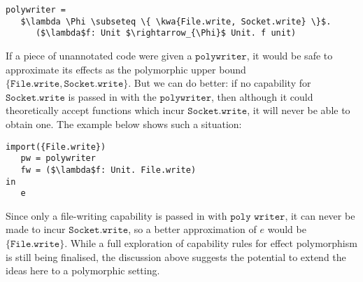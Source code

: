 \documentclass[sigplan,10pt]{acmart}\settopmatter{}
\newcommand{\kwa}[1]{\mathtt{#1}}
\begin{document}
\begin{lstlisting}
polywriter =
   $\lambda \Phi \subseteq \{ \kwa{File.write, Socket.write} \}$.
      ($\lambda$f: Unit $\rightarrow_{\Phi}$ Unit. f unit)
\end{lstlisting}

If a piece of unannotated code were given a $\kwa{polywriter}$, it would be safe to approximate its effects as the polymorphic upper bound $\{ \kwa{File.write, Socket.write} \}$. But we can do better: if no capability for $\kwa{Socket.write}$ is passed in with the $\kwa{polywriter}$, then although it could theoretically accept functions which incur $\kwa{Socket.write}$, it will never be able to obtain one. The example below shows such a situation:

\begin{lstlisting}
import({File.write}) 
   pw = polywriter
   fw = ($\lambda$f: Unit. File.write)
in
   e
\end{lstlisting}

Since only a file-writing capability is passed in with $\kwa{poly}$ $\kwa{writer}$, it can never be made to incur $\kwa{Socket.write}$, so a better approximation of $e$ would be $\{ \kwa{File.write} \}$.
While a full exploration of capability rules for effect polymorphism is still being finalised, the discussion above suggests the potential to extend the ideas here to a polymorphic setting.
\end{document}
